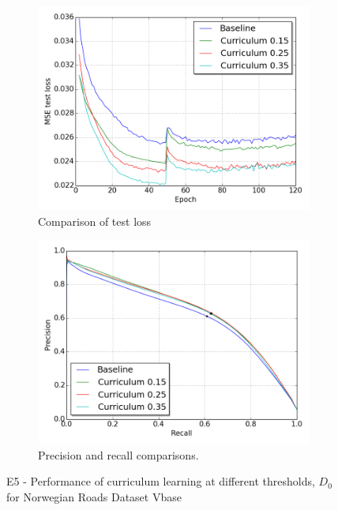 \begin{figure}[h]
\begin{subfigure}{0.5\textwidth}
\includegraphics[width=\linewidth]{figs/E5/E5-lc.png}
\caption{Comparison of test loss} \label{fig:E5_curr_norway_loss}
\end{subfigure}
\hspace*{\fill} %
\begin{subfigure}{0.5\textwidth}
\includegraphics[width=\linewidth]{figs/E5/E5-pr.png}
\caption{Precision and recall comparisons.} \label{fig:E5_curr_norway_pr}
\end{subfigure}
\hspace*{\fill} %
\caption[E5 - Performance of curriculum learning for Norwegian Roads Dataset Vbase]{E5 - Performance of curriculum learning at different thresholds, $D_{0}$ for Norwegian Roads Dataset Vbase} \label{fig:E5_curriculum_norway}
\end{figure}

